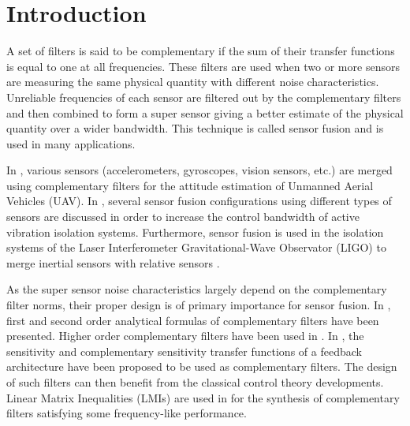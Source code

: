 \documentclass[conference]{IEEEtran}
\begin{document}
\section{Introduction}
\label{sec:org88c7d86}
\label{sec:introduction}
A set of filters is said to be complementary if the sum of their transfer functions is equal to one at all frequencies.
These filters are used when two or more sensors are measuring the same physical quantity with different noise characteristics. Unreliable frequencies of each sensor are filtered out by the complementary filters and then combined to form a super sensor giving a better estimate of the physical quantity over a wider bandwidth.
This technique is called sensor fusion and is used in many applications.\par
In \cite{zimmermann92_high_bandw_orien_measur_contr,corke04_inert_visual_sensin_system_small_auton_helic,min15_compl_filter_desig_angle_estim}, various sensors (accelerometers, gyroscopes, vision sensors, etc.) are merged using complementary filters for the attitude estimation of Unmanned Aerial Vehicles (UAV).
In \cite{collette15_sensor_fusion_method_high_perfor}, several sensor fusion configurations using different types of sensors are discussed in order to increase the control bandwidth of active vibration isolation systems.
Furthermore, sensor fusion is used in the isolation systems of the Laser Interferometer Gravitational-Wave Observator (LIGO) to merge inertial sensors with relative sensors
\cite{matichard15_seism_isolat_advan_ligo,hua04_polyp_fir_compl_filter_contr_system}. \par
As the super sensor noise characteristics largely depend on the complementary filter norms, their proper design is of primary importance for sensor fusion.
In \cite{corke04_inert_visual_sensin_system_small_auton_helic,jensen13_basic_uas,min15_compl_filter_desig_angle_estim}, first and second order analytical formulas of complementary filters have been presented.
Higher order complementary filters have been used in
\cite{shaw90_bandw_enhan_posit_measur_using_measur_accel,zimmermann92_high_bandw_orien_measur_contr,collette15_sensor_fusion_method_high_perfor}.
In \cite{jensen13_basic_uas}, the sensitivity and complementary sensitivity transfer functions of a feedback architecture have been proposed to be used as complementary filters. The design of such filters can then benefit from the classical control theory developments.
Linear Matrix Inequalities (LMIs) are used in \cite{pascoal99_navig_system_desig_using_time} for the synthesis of complementary filters satisfying some frequency-like performance.
\end{document}
